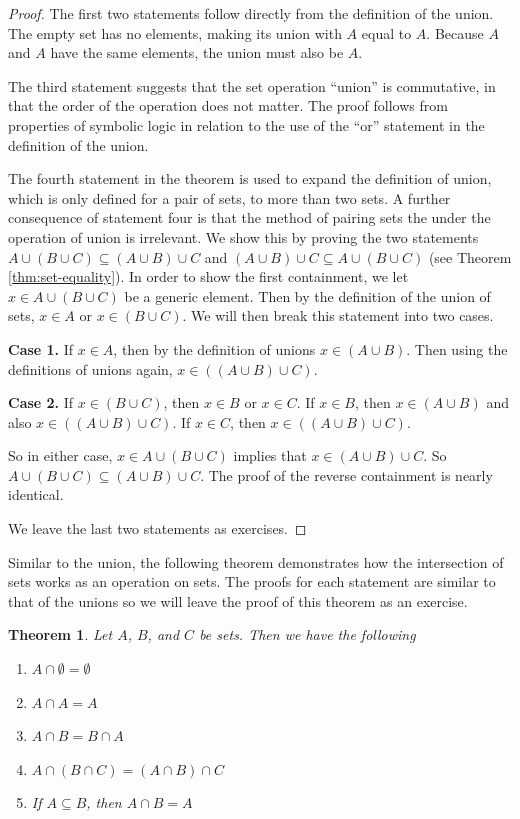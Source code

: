 \documentclass[
]{book}
\newtheorem{theorem}{Theorem}[chapter]
\theoremstyle{definition}
\theoremstyle{definition}
\theoremstyle{definition}
\theoremstyle{remark}
\begin{document}
\begin{proof}
{}The first two statements follow directly from the definition of the union. The empty set has no elements, making its union with \(A\) equal to \(A\). Because \(A\) and \(A\) have the same elements, the union must also be \(A\).

The third statement suggests that the set operation ``union'' is commutative, in that the order of the operation does not matter. The proof follows from properties of symbolic logic in relation to the use of the ``or'' statement in the definition of the union.

The fourth statement in the theorem is used to expand the definition of union, which is only defined for a pair of sets, to more than two sets. A further consequence of statement four is that the method of pairing sets the under the operation of union is irrelevant. We show this by proving the two statements \(A \cup (B\cup C ) \subseteq (A\cup B) \cup C\) and \((A\cup B) \cup C \subseteq A \cup (B\cup C)\) (see Theorem \ref{thm:set-equality}). In order to show the first containment, we let \(x\in A \cup (B\cup C )\) be a generic element. Then by the definition of the union of sets, \(x\in A\) or \(x\in (B\cup C)\). We will then break this statement into two cases.

\textbf{Case 1.} If \(x\in A\), then by the definition of unions \(x\in (A \cup B)\). Then using the definitions of unions again, \(x \in ((A \cup B) \cup C)\).

\textbf{Case 2.} If \(x\in (B\cup C)\), then \(x\in B\) or \(x\in C\). If \(x\in B\), then \(x\in (A\cup B)\) and also \(x\in ((A\cup B) \cup C)\). If \(x\in C\), then \(x\in ((A\cup B) \cup C)\).

So in either case, \(x \in A \cup (B\cup C)\) implies that \(x\in (A\cup B) \cup C\). So \(A\cup (B\cup C) \subseteq (A\cup B)\cup C\). The proof of the reverse containment is nearly identical.

We leave the last two statements as exercises.
\end{proof}

Similar to the union, the following theorem demonstrates how the intersection of sets works as an operation on sets. The proofs for each statement are similar to that of the unions so we will leave the proof of this theorem as an exercise.

\begin{theorem}
\protect\hypertarget{thm:intersections}{}{\label{thm:intersections} }Let \(A\), \(B\), and \(C\) be sets. Then we have the following

\begin{enumerate}
\def\labelenumi{\arabic{enumi}.}
\item
  \(A\cap \emptyset = \emptyset\)
\item
  \(A \cap A = A\)
\item
  \(A \cap B = B \cap A\)
\item
  \(A \cap (B\cap C ) = (A\cap B) \cap C\)
\item
  If \(A \subseteq B\), then \(A \cap B = A\)
\end{enumerate}
\end{theorem}
\end{document}

